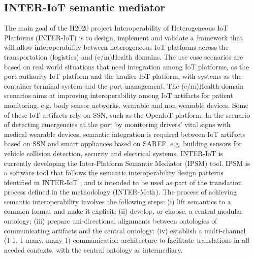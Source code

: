 \documentclass{sig-alternate-05-2015}
\begin{document}
\subsection{INTER-IoT semantic mediator}
The main goal of the H2020 project Interoperability of Heterogeneous IoT Platforms (INTER-IoT) \cite{Ganzha2017a,Ganzha2016} is to design, implement and validate a framework that will allow interoperability between heterogeneous IoT platforms across the transportation (logistics) and (e/m)Health domains. The use case scenarios are based on real world situations that need integration among IoT platforms, as the port authority IoT platform and the haulier IoT platform, with systems as the container terminal system and the port management. The (e/m)Health domain scenarios aims at improving interoperability among IoT artifacts for patient monitoring, e.g. body sensor networks, wearable and non-wearable devices. Some of these IoT artifacts rely on SSN, such as the OpenIoT platform. In the scenario of detecting emergencies at the port by monitoring drivers' vital signs with medical wearable devices, semantic integration is required between IoT artifacts based on SSN and smart appliances based on SAREF, e.g. building sensors for vehicle collision detection, security and electrical systems. INTER-IoT is currently developing the  Inter-Platform Semantic Mediator (IPSM) tool. IPSM is a software tool that follows the semantic interoperability design patterns identified in INTER-IoT \cite{Ganzha2017a}, and is intended to be used as part of the translation process defined in the methodology (INTER-Meth). The process of achieving semantic interoperability involves the following steps: (i) lift semantics to a common format and make it explicit; (ii) develop, or choose, a central modular ontology; (iii) prepare uni-directional alignments between ontologies of communicating artifacts and the central ontology; (iv) establish a multi-channel (1-1, 1-many, many-1) communication architecture to facilitate translations in all needed contexts, with the central ontology as intermediary.

\end{document}
